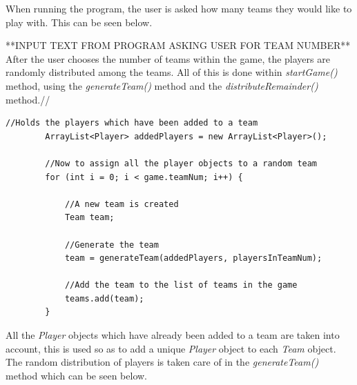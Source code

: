 \documentclass[a4paper,12pt]{extarticle}
\begin{document}
\noindent When running the program, the user is asked how many teams they would like to play with. This can be seen below.

**INPUT TEXT FROM PROGRAM ASKING USER FOR TEAM NUMBER**\\

\noindent After the user chooses the number of teams within the game, the players are randomly distributed among the teams. All of this is done within \textit{startGame()} method, using the \textit{generateTeam()} method and the \textit{distributeRemainder()} method.//
\vspace{4mm}

\begin{lstlisting}
//Holds the players which have been added to a team
        ArrayList<Player> addedPlayers = new ArrayList<Player>();

        //Now to assign all the player objects to a random team
        for (int i = 0; i < game.teamNum; i++) {

            //A new team is created
            Team team;

            //Generate the team
            team = generateTeam(addedPlayers, playersInTeamNum);

            //Add the team to the list of teams in the game
            teams.add(team);
        }
\end{lstlisting}
\vspace{-1mm}

\noindent All the \textit{Player} objects which have already been added to a team are taken into account, this is used so as to add a unique \textit{Player} object to each \textit{Team} object. The random distribution of players is taken care of in the \textit{generateTeam()} method which can be seen below.\\
\end{document}

